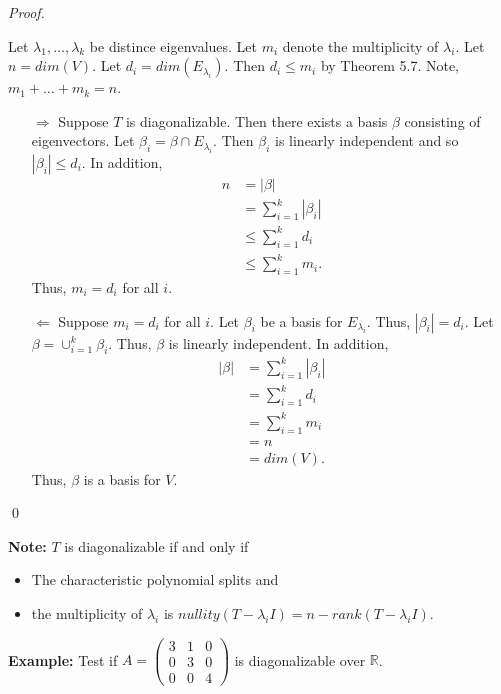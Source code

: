 \documentclass[12pt]{article}
\newenvironment{sol}
    {\emph{Proof.}
    }
    {
    \qed
    }
\begin{document}
\begin{sol}
Let $\lambda_1, \dots, \lambda_k$ be distince eigenvalues. Let $m_i$ denote the multiplicity of $\lambda_i$. Let $n = dim(V)$. Let $d_i = dim(E_{\lambda_i})$. Then $d_i \leq m_i$ by Theorem 5.7. Note, $m_1 + \dots + m_k = n$.

\begin{itemize}
    \item[$\Longrightarrow$] Suppose $T$ is diagonalizable. Then there exists a basis $\beta$ consisting of eigenvectors. Let $\beta_i = \beta \cap E_{\lambda_i}$. Then $\beta_i$ is linearly independent and so $\left| \beta_i \right| \leq d_i$. In addition, \begin{align*}
        n &= |\beta| \\
        &= \sum_{i = 1}^k \left| \beta_i \right| \\
        &\leq \sum_{i = 1}^k d_i \\
        &\leq \sum_{i = 1}^k m_i. \tag{By Theorem 5.7}
    \end{align*} Thus, $m_i = d_i$ for all $i$. 
    
    \item[$\Longleftarrow$] Suppose $m_i = d_i$ for all $i$. Let $\beta_i$ be a basis for $E_{\lambda_i}$. Thus, $\left| \beta_i \right| = d_i$. Let $\beta = \cup_{i = 1}^k \beta_i$. Thus, $\beta$ is linearly independent. In addition, \begin{align*}
        | \beta | &= \sum_{i = 1}^k \left| \beta_i \right| \\
        &= \sum_{i = 1}^k d_i \\
        &= \sum_{i = 1}^k m_i \\
        &= n \\
        &= dim(V).
    \end{align*} Thus, $\beta$ is a basis for $V$.
\end{itemize}
\end{sol}

\noindent \textbf{Note:} $T$ is diagonalizable if and only if 
\begin{itemize}
    \item The characteristic polynomial splits and
    \item the multiplicity of $\lambda_i$ is $nullity(T - \lambda_iI) = n - rank(T - \lambda_iI)$.
\end{itemize}

\noindent\textbf{Example:} Test if $A = \begin{pmatrix}
     3 & 1 & 0 \\ 0 & 3 & 0 \\ 0 & 0 & 4
\end{pmatrix}$ is diagonalizable over $\mathbb{R}$. 
\end{document}
